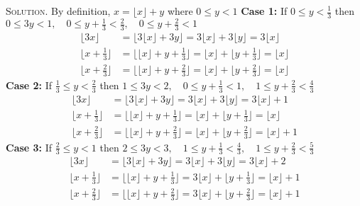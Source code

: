 \documentclass[12pt, a4paper, oneside]{article}
\newenvironment{solution}{\par\noindent\textsc{Solution. }}{\\\par}
\begin{document}
\begin{solution}
    By definition, $x = \lfloor x \rfloor + y$ where $0\le y < 1$
    \newline\textbf{Case 1:} If $0\le y < \frac{1}{3}$ then $0\le 3y < 1,\quad 0\le y + \frac{1}{3} < \frac{2}{3},\quad 0\le y + \frac{2}{3} < 1$
    \begin{align*}
        \lfloor 3x \rfloor &= \lfloor 3\lfloor x \rfloor + 3y\rfloor= 3\lfloor x \rfloor + 3\lfloor y \rfloor = 3\lfloor x \rfloor \\
        \lfloor x + \frac{1}{3} \rfloor  &= \lfloor \lfloor x \rfloor + y + \frac{1}{3}\rfloor= \lfloor x \rfloor + \lfloor y + \frac{1}{3} \rfloor = \lfloor x \rfloor\\
        \lfloor x + \frac{2}{3} \rfloor  &= \lfloor \lfloor x \rfloor + y + \frac{2}{3}\rfloor= \lfloor x \rfloor + \lfloor y + \frac{2}{3} \rfloor = \lfloor x \rfloor
    \end{align*}
    \textbf{Case 2:} If $\frac{1}{3} \le y < \frac{2}{3}$ then $1\le 3y < 2,\quad 0\le y + \frac{1}{3} < 1,\quad 1\le y + \frac{2}{3} < \frac{4}{3}$
    \begin{align*}
        \lfloor 3x \rfloor &= \lfloor 3\lfloor x \rfloor + 3y\rfloor= 3\lfloor x \rfloor + 3\lfloor y \rfloor = 3\lfloor x \rfloor + 1\\
        \lfloor x + \frac{1}{3} \rfloor  &= \lfloor \lfloor x \rfloor + y + \frac{1}{3}\rfloor= \lfloor x \rfloor + \lfloor y +\frac{1}{3} \rfloor = \lfloor x \rfloor\\
        \lfloor x + \frac{2}{3} \rfloor  &= \lfloor \lfloor x \rfloor + y + \frac{2}{3}\rfloor= \lfloor x \rfloor + \lfloor y + \frac{2}{3}\rfloor = \lfloor x \rfloor + 1
    \end{align*}
    \textbf{Case 3:} If $\frac{2}{3}\le y < 1$ then $2\le 3y < 3,\quad 1\le y + \frac{1}{3} < \frac{4}{3},\quad 1\le y + \frac{2}{3} < \frac{5}{3}$
    \begin{align*}
        \lfloor 3x \rfloor &= \lfloor 3\lfloor x \rfloor + 3y\rfloor= 3\lfloor x \rfloor + 3\lfloor y \rfloor = 3\lfloor x \rfloor + 2\\
        \lfloor x + \frac{1}{3} \rfloor  &= \lfloor \lfloor x \rfloor + y + \frac{1}{3}\rfloor= 3\lfloor x \rfloor + \lfloor y + \frac{1}{3} \rfloor = \lfloor x \rfloor + 1\\
        \lfloor x + \frac{2}{3} \rfloor  &= \lfloor \lfloor x \rfloor + y + \frac{2}{3}\rfloor= 3\lfloor x \rfloor + \lfloor y + \frac{2}{3} \rfloor = \lfloor x \rfloor + 1
    \end{align*}
\end{solution}
\end{document}
